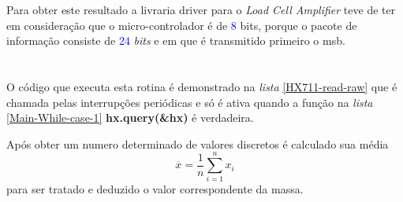 Para obter este resultado a livraria driver para o \textit{Load Cell Amplifier} teve de ter em consideração que o micro-controlador é de \textcolor{blue}{8} bits, porque o pacote de informação consiste de \textcolor{blue}{24} \textit{bits} e em que é transmitido primeiro o \ac{msb}.
\\
\\
\\
O código que executa esta rotina é demonstrado na \textit{lista} \ref{HX711-read-raw} que é chamada pelas interrupções periódicas e só é ativa quando a função na \textit{lista} \ref{Main-While-case-1} \textbf{hx.query(\&hx)} é verdadeira.
\\
{ \tiny
	
}
\newpage
{ \tiny
	
}
Após obter um numero determinado de valores discretos é calculado sua média
\begin{equation}
	\label{eq:Mean}
	\overline{x}  =  \frac{1}{n}\sum_{i=1}^n x_i
\end{equation}
para ser tratado e deduzido o valor correspondente da massa.
\newpage
